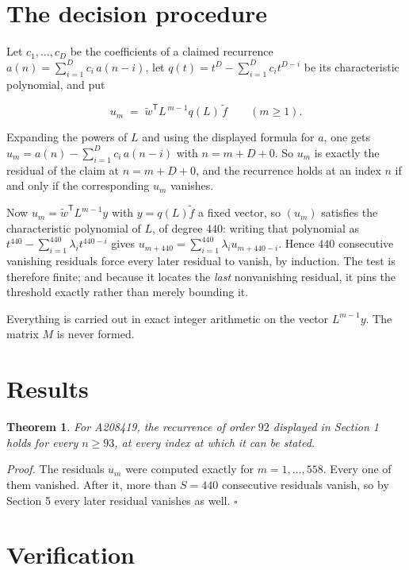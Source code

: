 \documentclass[11pt]{article}
\newtheorem{theorem}{Theorem}
\theoremstyle{definition}
\begin{document}
\section{The decision procedure}

Let $c_1,\dots,c_D$ be the coefficients of a claimed recurrence $a(n) = \sum_{i=1}^{D} c_i\,a(n-i)$, let $q(t) = t^{D} - \sum_{i=1}^{D} c_i t^{D-i}$ be its characteristic polynomial, and put

\[u_m \;=\; \tilde w^{\mathsf T} L^{\,m-1} q(L)\,\tilde f \qquad (m \ge 1).\]

Expanding the powers of $L$ and using the displayed formula for $a$, one gets $u_m = a(n) - \sum_{i=1}^{D} c_i\,a(n-i)$ with $n = m + D + 0$. So $u_m$ is exactly the residual of the claim at $n = m + D + 0$, and the recurrence holds at an index $n$ if and only if the corresponding $u_m$ vanishes.

Now $u_m = \tilde w^{\mathsf T} L^{m-1} y$ with $y = q(L)\tilde f$ a fixed vector, so $(u_m)$ satisfies the characteristic polynomial of $L$, of degree $440$: writing that polynomial as $t^{440} - \sum_{i=1}^{440} \lambda_i t^{440-i}$ gives $u_{m+440} = \sum_{i=1}^{440} \lambda_i u_{m+440-i}$. Hence $440$ consecutive vanishing residuals force every later residual to vanish, by induction. The test is therefore finite; and because it locates the {\itshape last} nonvanishing residual, it pins the threshold exactly rather than merely bounding it.

Everything is carried out in exact integer arithmetic on the vector $L^{m-1}y$. The matrix $M$ is never formed.

\section{Results}

\begin{theorem} For A208419, the recurrence of order $92$ displayed in Section 1 holds for every $n \ge 93$, at every index at which it can be stated.\end{theorem}

{\itshape Proof.} The residuals $u_m$ were computed exactly for $m = 1,\dots,558$. Every one of them vanished. After it, more than $S = 440$ consecutive residuals vanish, so by Section 5 every later residual vanishes as well. $\square$

\section{Verification}
\end{document}
